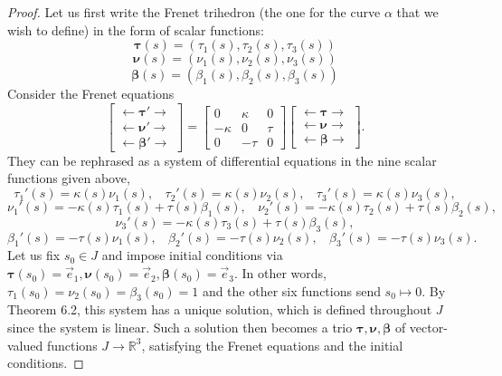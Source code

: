 \documentclass[leqno]{book}
\begin{document}
\begin{proof}
Let us first write the Frenet trihedron (the one for the curve $\alpha$ that we wish to define) in the form of scalar functions:
$$\boldsymbol\tau(s)=(\tau_1(s),\tau_2(s),\tau_3(s))$$
$$\boldsymbol\nu(s)=(\nu_1(s),\nu_2(s),\nu_3(s))$$
$$\boldsymbol\beta(s)=(\beta_1(s),\beta_2(s),\beta_3(s))$$
Consider the Frenet equations
$$\begin{bmatrix}\leftarrow\boldsymbol\tau'\rightarrow\\\leftarrow\boldsymbol\nu'\rightarrow\\\leftarrow\boldsymbol\beta'\rightarrow\end{bmatrix}=\begin{bmatrix}0&\kappa&0\\-\kappa&0&\tau\\0&-\tau&0\end{bmatrix}\begin{bmatrix}\leftarrow\boldsymbol\tau\rightarrow\\\leftarrow\boldsymbol\nu\rightarrow\\\leftarrow\boldsymbol\beta\rightarrow\end{bmatrix}.$$
They can be rephrased as a system of differential equations in the nine scalar functions given above,
\begin{equation}\tag{A}\tau_1'(s)=\kappa(s)\nu_1(s),~~~~\tau_2'(s)=\kappa(s)\nu_2(s),~~~~\tau_3'(s)=\kappa(s)\nu_3(s),\end{equation}
$$\nu_1'(s)=-\kappa(s)\tau_1(s)+\tau(s)\beta_1(s),~~~~\nu_2'(s)=-\kappa(s)\tau_2(s)+\tau(s)\beta_2(s),$$
$$\nu_3'(s)=-\kappa(s)\tau_3(s)+\tau(s)\beta_3(s),$$
$$\beta_1'(s)=-\tau(s)\nu_1(s),~~~~\beta_2'(s)=-\tau(s)\nu_2(s),~~~~\beta_3'(s)=-\tau(s)\nu_3(s).$$
Let us fix $s_0\in J$ and impose initial conditions via $\boldsymbol\tau(s_0)=\vec e_1,\boldsymbol\nu(s_0)=\vec e_2,\boldsymbol\beta(s_0)=\vec e_3$.  In other words, $\tau_1(s_0)=\nu_2(s_0)=\beta_3(s_0)=1$ and the other six functions send $s_0\mapsto 0$.  By Theorem 6.2, this system has a unique solution, which is defined throughout $J$ since the system is linear.  Such a solution then becomes a trio $\boldsymbol\tau,\boldsymbol\nu,\boldsymbol\beta$ of vector-valued functions $J\to\mathbb R^3$, satisfying the Frenet equations and the initial conditions.


\end{proof}
\end{document}
